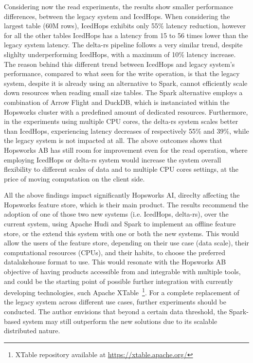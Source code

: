 Considering now the read experiments, the results show smaller performance differences, between the legacy system and IcedHops. When considering the largest table (60M rows), IcedHops exhibits only 55\% latency reduction, however for all the other tables IcedHops has a latency from 15 to 56 times lower than the legacy system latency. The delta-rs pipeline follows a very similar trend, despite slighlty underperforming IcedHops, with a maximum of 10\% latency increase. The reason behind this different trend between IcedHops and legacy system's performance, compared to what seen for the write operation, is that the legacy system, despite it is already using an alternative to Spark, cannot efficiently scale down resources when reading small size tables. The Spark alternative employs a combination of Arrow Flight and DuckDB, which is instanciated within the Hopsworks cluster with a predefined amount of dedicated resources. Furthermore, in the experiments using multiple \gls{CPU} cores, the delta-rs system scales better than IcedHops, experiencing latency decreases of respectively 55\% and 39\%, while the legacy system is not impacted at all. The above outcomes shows that Hopsworks AB has still room for improvement even for the read operation, where employing IcedHops or delta-rs system would increase the system overall flexibility to different scales of data and to multiple \gls{CPU} cores settings, at the price of moving computation on the client side.

All the above findings impact significantly Hopsworks AI, direclty affecting the Hopsworks feature store, which is their main product. The results recommend the adoption of one of those two new systems (i.e. IcedHops, delta-rs), over the current system, using Apache Hudi and Spark to implement an offline feature store, or the extend this system with one or both the new systems. This would allow the users of the feature store, depending on their use case (data scale), their computational resources (\glspl{CPU}), and their habits, to choose the preferred datalakehouse format to use. This would resonate with the Hopsworks AB objective of having products accessible from and integrable with multiple tools, and could be the starting point of possible further integration with currently developing technologies, such Apache XTable~\footnote{XTable repository available at \url{https://xtable.apache.org/}}. For a complete replacement of the legacy system across different use cases, further experiments should be conducted. The author envisions that beyond a certain data threshold, the Spark-based system may still outperform the new solutions due to its scalable distributed nature.

